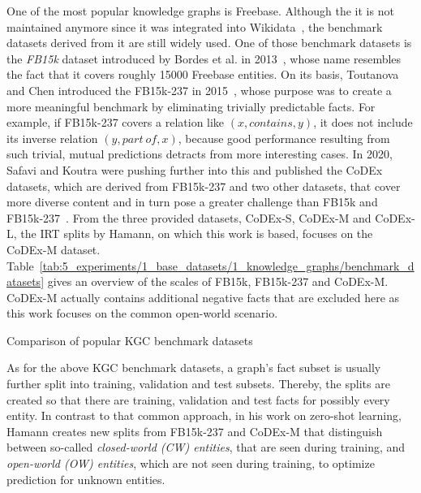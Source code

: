 One of the most popular knowledge graphs is Freebase. Although the it is not maintained anymore since it was integrated into Wikidata~\cite{Tanon2016FromFT}, the benchmark datasets derived from it are still widely used. One of those benchmark datasets is the \emph{FB15k} dataset introduced by Bordes et al. in 2013~\cite{Bordes2013TranslatingEF}, whose name resembles the fact that it covers roughly \num{15000} Freebase entities. On its basis, Toutanova and Chen introduced the FB15k-237 in 2015~\cite{Toutanova2015ObservedVL}, whose purpose was to create a more meaningful benchmark by eliminating trivially predictable facts. For example, if FB15k-237 covers a relation like $(x, contains, y)$, it does not include its inverse relation $(y, part~of, x)$, because good performance resulting from such trivial, mutual predictions detracts from more interesting cases. In 2020, Safavi and Koutra were pushing further into this and published the CoDEx datasets, which are derived from FB15k-237 and two other datasets, that cover more diverse content and in turn pose a greater challenge than FB15k and FB15k-237~\cite{Safavi2020CoDExAC}. From the three provided datasets, CoDEx-S, CoDEx-M and CoDEx-L, the IRT splits by Hamann, on which this work is based, focuses on the CoDEx-M dataset. Table~\ref{tab:5_experiments/1_base_datasets/1_knowledge_graphs/benchmark_datasets} gives an overview of the scales of FB15k, FB15k-237 and CoDEx-M. CoDEx-M actually contains additional negative facts that are excluded here as this work focuses on the common open-world scenario.

\begin{table}[h]
    \centering
    
    \caption{Comparison of popular KGC benchmark datasets}
    \label{tab:5_experiments/1_base_datasets/1_knowledge_graphs/benchmark_datasets}
\end{table}

As for the above KGC benchmark datasets, a graph's fact subset is usually further split into training, validation and test subsets. Thereby, the splits are created so that there are training, validation and test facts for possibly every entity. In contrast to that common approach, in his work on zero-shot learning, Hamann creates new splits from FB15k-237 and CoDEx-M that distinguish between so-called \emph{closed-world (CW) entities}, that are seen during training, and \emph{open-world (OW) entities}, which are not seen during training, to optimize prediction for unknown entities.

